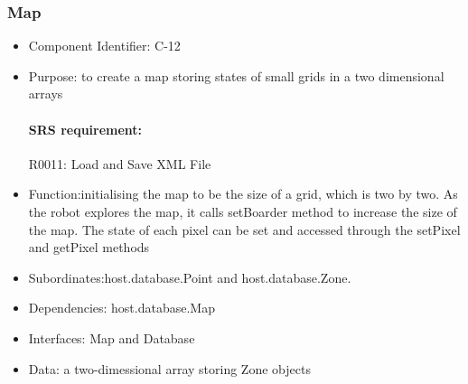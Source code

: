 \documentclass[11pt, a4paper]{report}
\begin{document}
\subsubsection{Map}
\begin{itemize}
\item Component Identifier: C-12
\item Purpose: to create a map storing states of small grids in a two dimensional arrays
\paragraph{SRS requirement:} R0011: Load and Save XML File
\item Function:initialising the map to be the size of a grid, which is two by two. As the robot
 explores the map, it calls setBoarder method to increase the size of the map. The state of each
 pixel can be set and accessed through the setPixel and getPixel methods
 
\item Subordinates:host.database.Point and host.database.Zone.
\item Dependencies: host.database.Map
\item Interfaces: Map and Database
\item Data: a two-dimessional array storing Zone objects
\end{itemize}

\end{document}
